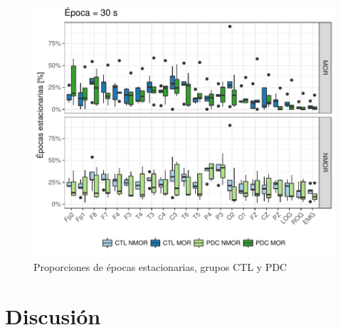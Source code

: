 \begin{figure}
\centering
\includegraphics[width=\linewidth]
{./img_art_dfa/Comparacion_gpos_MOR_NMOR_v3.pdf}
\caption{Proporciones de épocas estacionarias, grupos CTL y PDC}
\label{comparacion_graf}
\end{figure}


\section{Discusión}

